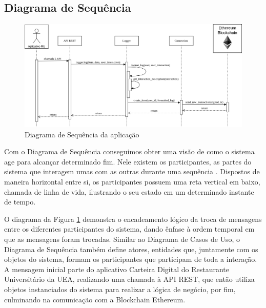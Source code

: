 \subsection{Diagrama de Sequência}
\begin{figure}
    \centering
    \includegraphics[width=1\textwidth]{img/Cap3/diagramas/Diagrama de SequÃªncia.drawio.png}
    \caption{Diagrama de Sequência da aplicação}
    \label{fig:diagrama_sequencia}
\end{figure}
Com o Diagrama de Sequência conseguimos obter uma visão de como o sistema age para alcançar determinado fim. Nele existem os participantes, as partes do sistema que interagem umas com as outras durante uma sequência \cite{Miles2006-fo}. Dispostos de maneira horizontal entre si, os participantes possuem uma reta vertical em baixo, chamada de linha de vida, ilustrando o seu estado em um determinado instante de tempo.

O diagrama da Figura \ref{fig:diagrama_sequencia} demonstra o encadeamento lógico da troca de mensagens entre os diferentes participantes do sistema, dando ênfase à ordem temporal em que as mensagens foram trocadas. Similar ao Diagrama de Casos de Uso, o Diagrama de Sequência também define atores, entidades que, juntamente com os objetos do sistema, formam os participantes que participam de toda a interação. A mensagem inicial parte do aplicativo Carteira Digital do Restaurante Universitário da UEA, realizando uma chamada à API REST, que então utiliza objetos instanciados do sistema para realizar a lógica de negócio, por fim, culminando na comunicação com a Blockchain Ethereum.

